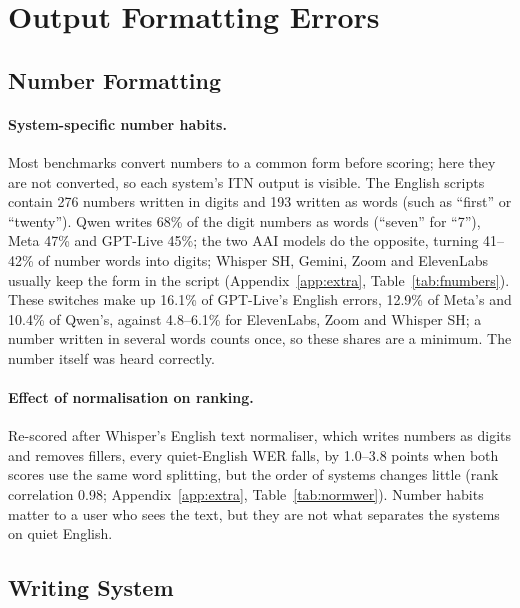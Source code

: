 \documentclass[11pt]{article}
\begin{document}
\FloatBarrier
\section{Output Formatting Errors}\label{sec:formatting}
\subsection{Number Formatting}\label{sec:numbers}
\paragraph{System-specific number habits.} Most benchmarks convert numbers to a common form before scoring; here they are not converted, so each system's ITN output is visible. The English scripts contain 276 numbers written in digits and 193 written as words (such as ``first'' or ``twenty''). Qwen writes 68\% of the digit numbers as words (``seven'' for ``7''), Meta 47\% and GPT-Live 45\%; the two AAI models do the opposite, turning 41--42\% of number words into digits; Whisper SH, Gemini, Zoom and ElevenLabs usually keep the form in the script (Appendix~\ref{app:extra}, Table~\ref{tab:fnumbers}). These switches make up 16.1\% of GPT-Live's English errors, 12.9\% of Meta's and 10.4\% of Qwen's, against 4.8--6.1\% for ElevenLabs, Zoom and Whisper SH; a number written in several words counts once, so these shares are a minimum. The number itself was heard correctly.

\paragraph{Effect of normalisation on ranking.} Re-scored after Whisper's English text normaliser, which writes numbers as digits and removes fillers, every quiet-English WER falls, by 1.0--3.8 points when both scores use the same word splitting, but the order of systems changes little (rank correlation 0.98; Appendix~\ref{app:extra}, Table~\ref{tab:normwer}). Number habits matter to a user who sees the text, but they are not what separates the systems on quiet English.

\subsection{Writing System}\label{sec:script}
\end{document}
